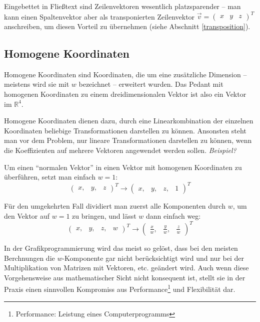 Eingebettet in Fließtext sind Zeilenvektoren wesentlich platzsparender -- man kann einen Spaltenvektor aber als transponierten Zeilenvektor $\vec{v} = \begin{pmatrix} x & y & z \end{pmatrix}^T$ anschreiben, um diesen Vorteil zu übernehmen (siehe Abschnitt \ref{transposition}).


\subsection{Homogene Koordinaten}
Homogene Koordinaten sind Koordinaten, die um eine zusätzliche Dimension -- meistens wird sie mit $w$ bezeichnet -- erweitert wurden. Das Pedant mit homogenen Koordinaten zu einem dreidimensionalen Vektor ist also ein Vektor im $\mathbb{R}^4$.

Homogene Koordinaten dienen dazu, durch eine Linearkombination der einzelnen Koordinaten beliebige Transformationen darstellen zu können. Ansonsten steht man vor dem Problem, nur lineare Transformationen darstellen zu können, wenn die Koeffizienten auf mehrere Vektoren angewendet werden sollen. \emph{Beispiel?}

Um einen \enquote{normalen Vektor} in einen Vektor mit homogenen Koordinaten zu überführen, setzt man einfach $w = 1$:
\begin{equation}
 \begin{pmatrix} x, & y, & z \end{pmatrix}^T \rightarrow \begin{pmatrix} x, & y, & z, & 1 \end{pmatrix}^T
\end{equation}

Für den umgekehrten Fall dividiert man zuerst alle Komponenten durch $w$, um den Vektor auf $w = 1$ zu bringen, und lässt $w$ dann einfach weg:
\begin{equation}
 \begin{pmatrix} x, & y, & z, & w \end{pmatrix}^T \rightarrow \begin{pmatrix} \frac{x}{w}, & \frac{y}{w}, & \frac{z}{w} \end{pmatrix}^T
\end{equation}

In der Grafikprogrammierung wird das meist so gelöst, dass bei den meisten Berchnungen die $w$-Komponente gar nicht berücksichtigt wird und nur bei der Multiplikation von Matrizen mit Vektoren, etc. geändert wird. Auch wenn diese Vorgehensweise aus mathematischer Sicht nicht konsequent ist, stellt sie in der Praxis einen sinnvollen Kompromiss aus Performance\footnote{Performance: Leistung eines Computerprogramms} und Flexibilität dar.

